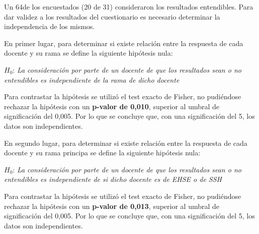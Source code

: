 Un 64\percentage{ }de los encuestados (20 de 31) consideraron los resultados entendibles. Para dar validez a los resultados del cuestionario es necesario determinar la independencia de los mismos.

En primer lugar, para determinar si existe relación entre la respuesta de cada docente y su rama se define la siguiente hipótesis nula:

\medskip
\begin{mdframed}[style=hipotesis0]
$H_0$: \emph{La consideración por parte de un docente de que los resultados sean o no entendibles es independiente de la rama de dicho docente}
\end{mdframed}

\medskip
Para contrastar la hipótesis se utilizó el test exacto de Fisher, no pudiéndose rechazar la hipótesis con un \textbf{p-valor de 0,010}, superior al umbral de significación del 0,005. Por lo que se concluye que, con una significación del 5\percentage, los datos son independientes.

En segundo lugar, para determinar si existe relación entre la respuesta de cada docente y su rama principa se define la siguiente hipótesis nula:

\medskip
\begin{mdframed}[style=hipotesis0]
$H_0$: \emph{La consideración por parte de un docente de que los resultados sean o no entendibles es independiente de si dicho docente es de EHSE o de SSH}
\end{mdframed}

\medskip
Para contrastar la hipótesis se utilizó el test exacto de Fisher, no pudiéndose rechazar la hipótesis con un \textbf{p-valor de 0,013}, superior al umbral de significación del 0,005. Por lo que se concluye que, con una significación del 5\percentage, los datos son independientes.

